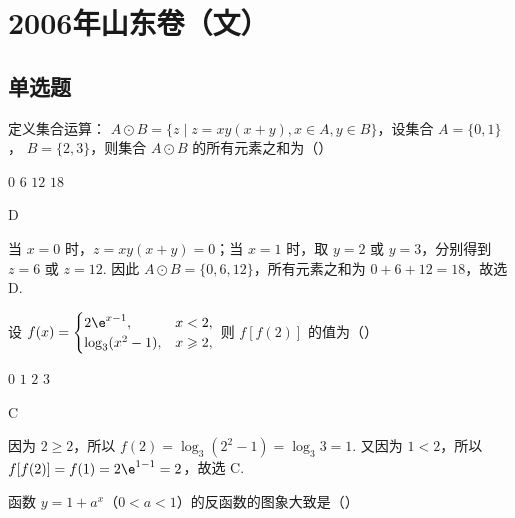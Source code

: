 \chapter{2006年山东卷（文）}
\section{单选题}
\begin{problem}
定义集合运算： \( A \odot B = \{z \mid z = xy(x + y), x \in A, y \in B\} \)，设集合 \( A = \{0, 1\} \)， \( B = \{2, 3\} \)，则集合 \( A \odot B \) 的所有元素之和为（\quad）

\choices
    {\(0\)}
    {\(6\)}
    {\(12\)}
    {\(18\)}
\end{problem}

\begin{answer}
D
\end{answer}

\begin{solution}
当 \(x=0\) 时，\(z=xy(x+y)=0\)；当 \(x=1\) 时，取 \(y=2\) 或 \(y=3\)，分别得到 \(z=6\) 或 \(z=12\). 因此 \(A\odot B=\{0,6,12\}\)，所有元素之和为 \(0+6+12=18\)，故选 D.
\end{solution}

\begin{problem}
设 \( f(x) = \begin{cases}
2\e^{x - 1}, & x < 2,\\
\log_3(x^2 - 1), & x \geqslant 2,
\end{cases} \) 则 \( f[f(2)] \) 的值为（\quad）

\choices
    {\(0\)}
    {\(1\)}
    {\(2\)}
    {\(3\)}
\end{problem}

\begin{answer}
C
\end{answer}

\begin{solution}
因为 \(2\geqslant2\)，所以 \(f(2)=\log_3(2^2-1)=\log_3 3=1\). 又因为 \(1<2\)，所以 \(f[f(2)]=f(1)=2\e^{1-1}=2\)，故选 C.
\end{solution}

\begin{problem}
函数 \( y = 1 + a^x \)（\(0 < a < 1\)）的反函数的图象大致是（\quad）

    {}
    {}
    {}
\end{problem}

